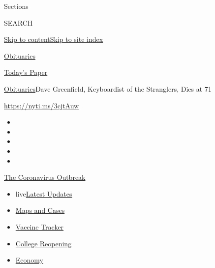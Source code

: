 Sections

SEARCH

\protect\hyperlink{site-content}{Skip to
content}\protect\hyperlink{site-index}{Skip to site index}

\href{https://www.nytimes.com/section/obituaries}{Obituaries}

\href{https://myaccount.nytimes.com/auth/login?response_type=cookie\&client_id=vi}{}

\href{https://www.nytimes.com/section/todayspaper}{Today's Paper}

\href{/section/obituaries}{Obituaries}\textbar{}Dave Greenfield,
Keyboardist of the Stranglers, Dies at 71

\url{https://nyti.ms/3cjtAuw}

\begin{itemize}
\item
\item
\item
\item
\item
\end{itemize}

\href{https://www.nytimes.com/news-event/coronavirus?action=click\&pgtype=Article\&state=default\&region=TOP_BANNER\&context=storylines_menu}{The
Coronavirus Outbreak}

\begin{itemize}
\tightlist
\item
  live\href{https://www.nytimes.com/2020/08/03/world/coronavirus-covid-19.html?action=click\&pgtype=Article\&state=default\&region=TOP_BANNER\&context=storylines_menu}{Latest
  Updates}
\item
  \href{https://www.nytimes.com/interactive/2020/us/coronavirus-us-cases.html?action=click\&pgtype=Article\&state=default\&region=TOP_BANNER\&context=storylines_menu}{Maps
  and Cases}
\item
  \href{https://www.nytimes.com/interactive/2020/science/coronavirus-vaccine-tracker.html?action=click\&pgtype=Article\&state=default\&region=TOP_BANNER\&context=storylines_menu}{Vaccine
  Tracker}
\item
  \href{https://www.nytimes.com/2020/08/02/us/covid-college-reopening.html?action=click\&pgtype=Article\&state=default\&region=TOP_BANNER\&context=storylines_menu}{College
  Reopening}
\item
  \href{https://www.nytimes.com/live/2020/08/03/business/stock-market-today-coronavirus?action=click\&pgtype=Article\&state=default\&region=TOP_BANNER\&context=storylines_menu}{Economy}
\end{itemize}

